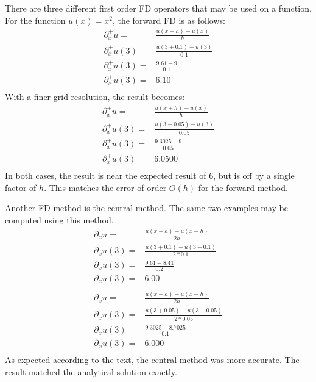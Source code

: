 \documentclass[twocolumn]{article}
\begin{document}
There are three different first order FD operators that may be used on a function. For the function $u(x)=x^2$, the forward FD is as follows:
\begin{equation}
\begin{split}
\partial_x^+ u =& \frac{u(x+h) - u(x)}{h} \\
\partial_x^+ u(3) =& \frac{u(3+0.1) - u(3)}{0.1} \\
\partial_x^+ u(3) =& \frac{9.61-9}{0.1} \\
\partial_x^+ u(3) =& 6.10 \\
\end{split}
\end{equation}
With a finer grid resolution, the result becomes:
\begin{equation}
\begin{split}
\partial_x^+ u =& \frac{u(x+h) - u(x)}{h} \\
\partial_x^+ u(3) =& \frac{u(3+0.05) - u(3)}{0.05} \\
\partial_x^+ u(3) =& \frac{9.3025-9}{0.05} \\
\partial_x^+ u(3) =& 6.0500 \\
\end{split}
\end{equation}
In both cases, the result is near the expected result of 6, but is off by a single factor of $h$. This matches the error of order $O(h)$ for the forward method. 

Another FD method is the central method. The same two examples may be computed using this method.
\begin{equation}
\begin{split}
\partial_x u =& \frac{u(x+h) - u(x-h)}{2h} \\
\partial_x u(3) =& \frac{u(3+0.1) - u(3-0.1)}{2*0.1} \\
\partial_x u(3) =& \frac{9.61-8.41}{0.2} \\
\partial_x u(3) =& 6.00 \\
\\ 
\partial_x u =& \frac{u(x+h) - u(x-h)}{2h} \\
\partial_x u(3) =& \frac{u(3+0.05) - u(3-0.05)}{2*0.05} \\
\partial_x u(3) =& \frac{9.3025-8.7025}{0.1} \\
\partial_x u(3) =& 6.000 \\
\end{split}
\end{equation}
As expected according to the text, the central method was more accurate. The result matched the analytical solution exactly.
\end{document}
